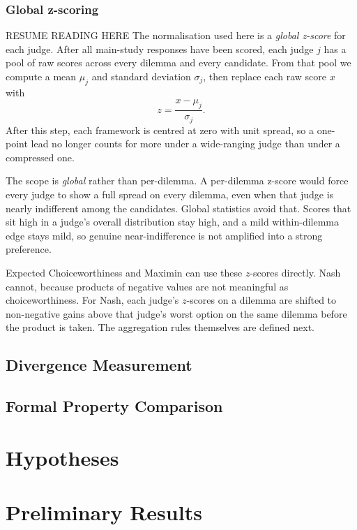 \documentclass[10pt,twocolumn,a4paper]{article}
\begin{document}
\subsubsection{Global z-scoring}
\label{sec:zscore}

RESUME READING HERE
The normalisation used here is a \emph{global z-score} for each judge. After
all main-study responses have been scored, each judge $j$ has a pool of raw
scores across every dilemma and every candidate. From that pool we compute a
mean $\mu_j$ and standard deviation $\sigma_j$, then replace each raw score
$x$ with
\[
  z = \frac{x - \mu_j}{\sigma_j}.
\]
After this step, each framework is centred at zero with unit spread, so a
one-point lead no longer counts for more under a wide-ranging judge than under
a compressed one.

The scope is \emph{global} rather than per-dilemma. A per-dilemma z-score would
force every judge to show a full spread on every dilemma, even when that judge
is nearly indifferent among the candidates. Global statistics avoid that.
Scores that sit high in a judge's overall distribution stay high, and a mild
within-dilemma edge stays mild, so genuine near-indifference is not amplified
into a strong preference.

Expected Choiceworthiness and Maximin can use these $z$-scores directly.
Nash cannot, because products of negative values are not meaningful as
choiceworthiness. For Nash, each judge's $z$-scores on a dilemma are shifted
to non-negative gains above that judge's worst option on the same dilemma
before the product is taken. The aggregation rules themselves are defined next.

\subsection{Divergence Measurement}

\subsection{Formal Property Comparison}

\section{Hypotheses}

\section{Preliminary Results}
\end{document}
